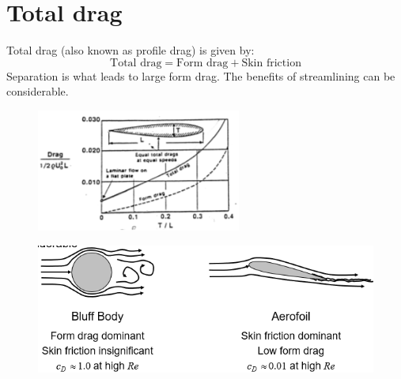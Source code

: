\documentclass[class=report, crop=false, 12pt,a4paper]{standalone}
\begin{document}
\section{Total drag}
Total drag (also known as profile drag) is given by:
\begin{equation}
  \textrm{Total drag} = \textrm{Form drag} + \textrm{Skin friction}
\end{equation}
Separation is what leads to large form drag. The benefits of streamlining can be considerable.
\begin{figure}[H]
  \centering
  \includegraphics[width = 0.6\textwidth]{../img/diagram46.png}
\end{figure} 
\begin{figure}[H]
  \centering
  \includegraphics[width = \textwidth]{../img/diagram47.png}
\end{figure} 
\end{document}
